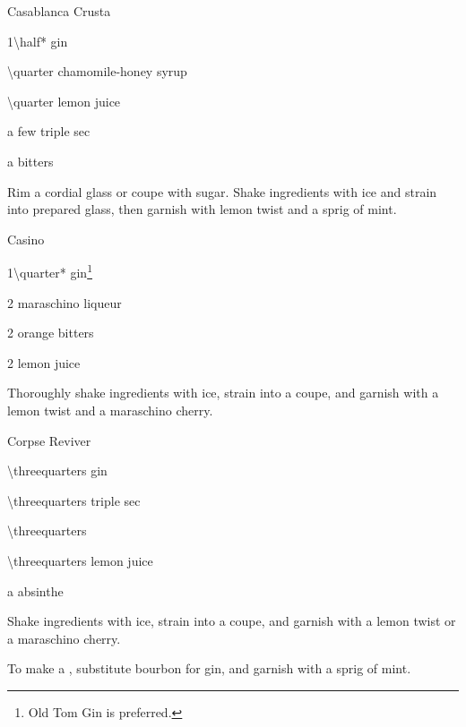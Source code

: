 \begin{Cocktail}{Casablanca Crusta}
	\begin{Ingredients}
	\item \SI{1\half*}{\oz} gin
	\item \SI{\quarter}{\oz} chamomile-honey syrup %
	\item \SI{\quarter}{\oz} lemon juice
	\item a few \si{\dashes} triple sec
	\item a \si{\dash} bitters
	\end{Ingredients}
	
	\begin{Instructions}
	Rim a cordial glass or coupe with sugar.  Shake ingredients with ice and strain into prepared glass, then garnish with lemon twist and a sprig of mint.
	\end{Instructions}
\end{Cocktail}

\begin{Cocktail}{Casino}
	\begin{Ingredients}
	\item \SI{1\quarter*}{\oz} gin\footnote{Old Tom Gin is preferred.}
	\item \SI{2}{\tsp} maraschino liqueur
	\item \SI{2}{\tsp} orange bitters
	\item \SI{2}{\tsp} lemon juice
	\item 
	\end{Ingredients}
	
	\begin{Instructions}
	Thoroughly shake ingredients with ice, strain into a coupe, and garnish with a lemon twist and a maraschino cherry.
	\end{Instructions}
\end{Cocktail}

\begin{Cocktail}{Corpse Reviver }
	\begin{Ingredients}
	\item \SI{\threequarters}{\oz} gin
	\item \SI{\threequarters}{\oz} triple sec
	\item \SI{\threequarters}{\oz} \Lillet
	\item \SI{\threequarters}{\oz} lemon juice
	\item a \si{\dash} absinthe
	\end{Ingredients}
	
	\begin{Instructions}\vspace{-3ex}
	Shake ingredients with ice, strain into a coupe, and garnish with a lemon twist or a maraschino cherry.
	
	To make a , substitute bourbon for gin, and garnish with a sprig of mint.
	\end{Instructions}
\end{Cocktail}

